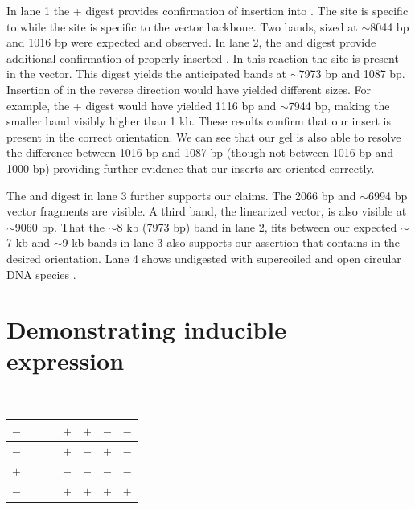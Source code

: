 In lane 1 the \stui+\xhoi{} digest provides confirmation of \stim{} insertion into \stimivector. The \stui{} site is specific to \stim{} while the \xhoi{} site is specific to the vector backbone. Two bands, sized at $\sim$8044 bp and 1016  bp were expected and observed. In lane 2, the \stui{} and \bamhi{} digest provide additional confirmation of properly inserted \stim. In this reaction the \bamhi{} site is present in the vector. This digest yields the anticipated bands at  $\sim$7973 bp and 1087 bp. 
Insertion of \stim{} in the reverse direction would have yielded different sizes. For example, the  \stui+\xhoi{} digest would have yielded 1116 bp and $\sim$7944 bp, making the smaller band visibly higher than 1 kb. These results confirm that our insert is present in the correct orientation. We can see that our gel is also able to resolve the difference between 1016 bp and 1087 bp (though not between 1016 bp and 1000 bp) providing further evidence that our inserts are oriented correctly. 

The \sali{} and \xbai{} digest in lane 3 further supports our claims. The 2066 bp \stim{} and $\sim$6994 bp vector fragments are visible. A third band, the linearized \stimivector{} vector, is also visible at $\sim$9060 bp. That the $\sim$8 kb (7973 bp) band in lane 2, fits between our expected $\sim$7 kb and $\sim$9 kb bands in lane 3 also supports our assertion that \stimivector{} contains \stim{} in the desired orientation. Lane 4 shows undigested \stimivector{} with supercoiled and open circular DNA species \citep{Sambrook2001}. 
  
\newpage


\section{Demonstrating inducible expression}
{~}
\begin{table}[!ht]\tiny 
\begin{center}\vspace{140pt}
\resizebox{9.9cm}{!} {
\begin{tabular}{|l|l|l|l|l|l|}
\hline

 $-$ & {~}{~}{~} & $+$ & $+$ & $-$ & $-$ \\ \hline
 $-$ &   & $+$ & $-$ & $+$ & $-$ \\ \hline
   $+$ &   & $-$ & $-$ & $-$ & $-$ \\ \hline
 $-$ &   & $+$ & $+$ & $+$ & $+$ \\ \hline

\end{tabular}
}
\end{center}\vspace{-140pt}
\end{table}%

